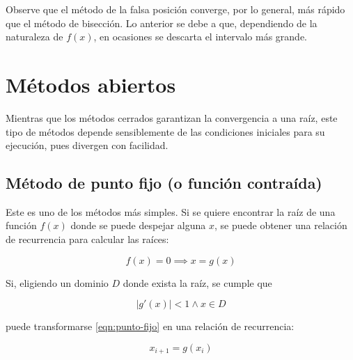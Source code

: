 Observe que el método de la falsa posición converge, por lo general, más rápido
que el método de bisección. Lo anterior se debe a que, dependiendo de la
naturaleza de $f(x)$, en ocasiones se descarta el intervalo más grande.


\section{Métodos abiertos}

Mientras que los métodos cerrados garantizan la convergencia a una raíz, este
tipo de métodos depende sensiblemente de las condiciones iniciales para su
ejecución, pues divergen con facilidad.

\subsection{Método de punto fijo (o función contraída)}

Este es uno de los métodos más simples. Si se quiere encontrar la raíz de una
función $f(x)$ donde se puede despejar alguna $x$, se puede obtener una
relación de recurrencia para calcular las raíces:

\begin{equation}\label{eqn:punto-fijo}
	f(x) = 0 \implies \boxed{x = g(x)}
\end{equation}

Si, eligiendo un dominio $D$ donde exista la raíz, se cumple que

\[
	\left| g'(x) \right| < 1 \land x \in D
\]

puede transformarse \ref{eqn:punto-fijo} en una relación de recurrencia:

\begin{equation} \label{eqn:recurrencia-punto-fijo}
    \boxed{x_{i+1} = g(x_i)}
\end{equation}

